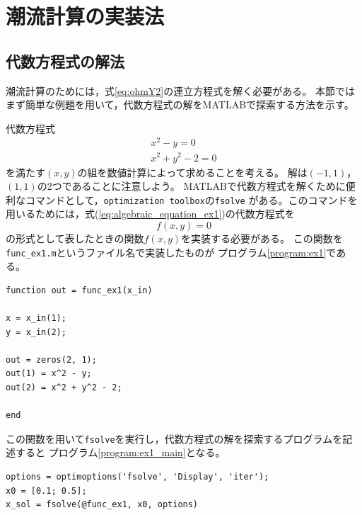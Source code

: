\documentclass[tombow,dvipdfmx]{corona-a5-1.1}
\begin{document}
\section{潮流計算の実装法}
{
\newcommand{\omitcode}{（略）}
\subsection{代数方程式の解法}
潮流計算のためには，式\ref{eq:ohmY2}の連立方程式を解く必要がある。
本節ではまず簡単な例題を用いて，代数方程式の解をMATLABで探索する方法を示す。
\begin{例}[代数方程式の解の探索]\label{ex:algenraic_equation_ex1}
代数方程式
\begin{subequations}\label{eq:algebraic_equation_ex1}
\begin{align}
x^2 - y = 0\\
x^2 + y^2 - 2 = 0
\end{align}
\end{subequations}
を満たす$(x, y)$の組を数値計算によって求めることを考える。
解は$(-1, 1)$，$(1, 1)$の2つであることに注意しよう。
MATLABで代数方程式を解くために便利なコマンドとして，\verb|optimization toolbox|の\verb|fsolve|
がある。このコマンドを用いるためには，式(\ref{eq:algebraic_equation_ex1})の代数方程式を
\[
f(x,y)=0
\]
の形式として表したときの関数$f(x,y)$を実装する必要がある。
この関数を\verb|func_ex1.m|というファイル名で実装したものが
プログラム\nobreak\ref{program:ex1}である。

\smallskip
\begin{PROGRAMA}[count,title={func\_ex1.m}]\label{program:ex1}
\begin{verbatim}
function out = func_ex1(x_in)

x = x_in(1);
y = x_in(2);

out = zeros(2, 1);
out(1) = x^2 - y;
out(2) = x^2 + y^2 - 2;

end
\end{verbatim}
\end{PROGRAMA}

この関数を用いて\verb|fsolve|を実行し，代数方程式の解を探索するプログラムを記述すると
プログラム\nobreak\ref{program:ex1_main}となる。
\smallskip
\begin{PROGRAMA}[count,title={main\_ex1.m}]\label{program:ex1_main}
\begin{verbatim}
options = optimoptions('fsolve', 'Display', 'iter');
x0 = [0.1; 0.5];
x_sol = fsolve(@func_ex1, x0, options)
\end{verbatim}
\end{PROGRAMA}


\end{例}}
\end{document}
